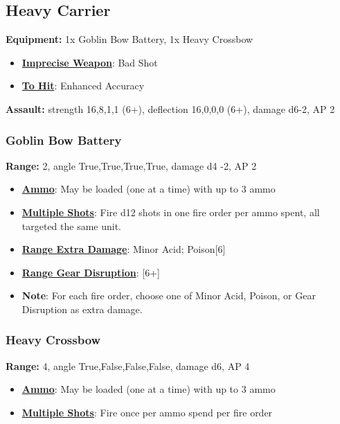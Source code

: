 \documentclass[a4paper,12pt]{article}
\begin{document}
\subsection{Heavy Carrier}

\textbf{Equipment:} 1x Goblin Bow Battery, 1x Heavy Crossbow \\

\begin{itemize}
\item \textbf{\hyperref[rule-special-to-hit]{Imprecise Weapon}}: Bad Shot
\item \textbf{\hyperref[rule-special-to-hit]{To Hit}}: Enhanced Accuracy
\end{itemize}
\textbf{Assault:} strength 16,8,1,1 (6+),
deflection 16,0,0,0 (6+),
damage d6-2, AP 2


\subsubsection{Goblin Bow Battery}

\textbf{Range:} 2, angle True,True,True,True, damage d4 -2, AP 2

\begin{itemize}
\item \textbf{\hyperref[rule-special-ammo]{Ammo}}: May be loaded (one at a time) with up to 3 ammo
\item \textbf{\hyperref[rule-special-multiple-shots]{Multiple Shots}}: Fire d12 shots in one fire order per ammo spent, all targeted the same unit.
\item \textbf{\hyperref[rule-special-range-extra-damage]{Range Extra Damage}}: Minor Acid; Poison[6]
\item \textbf{\hyperref[rule-special-range-gear-disruption]{Range Gear Disruption}}: [6+]
\item \textbf{Note}: For each fire order, choose one of Minor Acid, Poison, or Gear Disruption as extra damage.
\end{itemize}
\subsubsection{Heavy Crossbow}

\textbf{Range:} 4, angle True,False,False,False, damage d6, AP 4

\begin{itemize}
\item \textbf{\hyperref[rule-special-ammo]{Ammo}}: May be loaded (one at a time) with up to 3 ammo
\item \textbf{\hyperref[rule-special-multiple-shots]{Multiple Shots}}: Fire once per ammo spend per fire order
\end{itemize}
\end{document}
